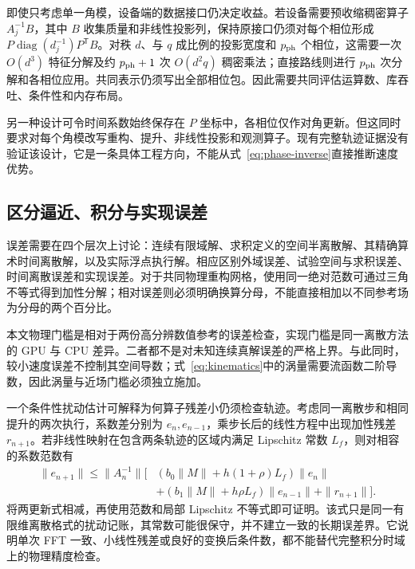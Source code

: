 即使只考虑单一角模，设备端的数据接口仍决定收益。若设备需要预收缩稠密算子 \(A_j^{-1}B\)，其中 \(B\) 收集质量和非线性投影列，保持原接口仍须对每个相位形成 \(P\operatorname{diag}(d_j^{-1})P^{\mathsf T}B\)。对秩 \(d\)、与 \(q\) 成比例的投影宽度和 \(p_{\rm ph}\) 个相位，这需要一次 \(O(d^3)\) 特征分解及约 \(p_{\rm ph}+1\) 次 \(O(d^2q)\) 稠密乘法；直接路线则进行 \(p_{\rm ph}\) 次分解和各相位应用。共同表示仍须写出全部相位包。因此需要共同评估运算数、库吞吐、条件性和内存布局。

另一种设计可令时间系数始终保存在 \(P\) 坐标中，各相位仅作对角更新。但这同时要求对每个角模改写重构、提升、非线性投影和观测算子。现有完整轨迹证据没有验证该设计，它是一条具体工程方向，不能从式~\eqref{eq:phase-inverse}直接推断速度优势。

\subsection{区分逼近、积分与实现误差}

误差需要在四个层次上讨论：连续有限域解、求积定义的空间半离散解、其精确算术时间离散解，以及实际浮点执行解。相应区别外域误差、试验空间与求积误差、时间离散误差和实现误差。对于共同物理重构网格，使用同一绝对范数可通过三角不等式得到加性分解；相对误差则必须明确换算分母，不能直接相加以不同参考场为分母的两个百分比。

本文物理门槛是相对于两份高分辨数值参考的误差检查，实现门槛是同一离散方法的 GPU 与 CPU 差异。二者都不是对未知连续真解误差的严格上界。与此同时，较小速度误差不控制其空间导数；式~\eqref{eq:kinematics}中的涡量需要流函数二阶导数，因此涡量与近场门槛必须独立施加。

一个条件性扰动估计可解释为何算子残差小仍须检查轨迹。考虑同一离散步和相同提升的两次执行，系数差分别为 \(e_n,e_{n-1}\)，乘步长后的线性方程中出现加性残差 \(r_{n+1}\)。若非线性映射在包含两条轨迹的区域内满足 Lipschitz 常数 \(L_f\)，则对相容的系数范数有
\begin{equation}
 \begin{aligned}
 \|e_{n+1}\|\le\|A_n^{-1}\|\big[&
 (b_0\|M\|+h(1+\rho)L_f)\|e_n\|\\
 &+(b_1\|M\|+h\rho L_f)\|e_{n-1}\|
 +\|r_{n+1}\|\big].
 \end{aligned}
 \label{eq:perturbation-accounting}
\end{equation}
将两更新式相减，再使用范数和局部 Lipschitz 不等式即可证明。该式只是同一有限维离散格式的扰动记账，其常数可能很保守，并不建立一致的长期误差界。它说明单次 FFT 一致、小线性残差或良好的变换后条件数，都不能替代完整积分时域上的物理精度检查。
